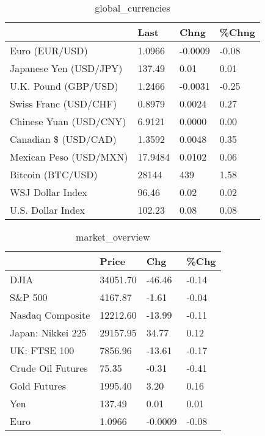 \documentclass{article}%
\begin{document}
%


\begin{table}[htbp]%
\caption{global\_currencies}%
\centering%
\begin{adjustbox}{width=1\textwidth}%
\begin{tabular}{llll}
\toprule
                       &    Last &    Chng & \%Chng \\
\midrule
        Euro (EUR/USD) &  1.0966 & -0.0009 & -0.08 \\
Japanese Yen (USD/JPY) &  137.49 &    0.01 &  0.01 \\
  U.K. Pound (GBP/USD) &  1.2466 & -0.0031 & -0.25 \\
 Swiss Franc (USD/CHF) &  0.8979 &  0.0024 &  0.27 \\
Chinese Yuan (USD/CNY) &  6.9121 &  0.0000 &  0.00 \\
  Canadian \$ (USD/CAD) &  1.3592 &  0.0048 &  0.35 \\
Mexican Peso (USD/MXN) & 17.9484 &  0.0102 &  0.06 \\
     Bitcoin (BTC/USD) &   28144 &     439 &  1.58 \\
      WSJ Dollar Index &   96.46 &    0.02 &  0.02 \\
     U.S. Dollar Index &  102.23 &    0.08 &  0.08 \\
\bottomrule
\end{tabular}
%
\end{adjustbox}%
\end{table}

%


\begin{table}[htbp]%
\caption{market\_overview}%
\centering%
\begin{adjustbox}{width=1\textwidth}%
\begin{tabular}{llll}
\toprule
                  &    Price &     Chg &  \%Chg \\
\midrule
             DJIA & 34051.70 &  -46.46 & -0.14 \\
          S\&P 500 &  4167.87 &   -1.61 & -0.04 \\
 Nasdaq Composite & 12212.60 &  -13.99 & -0.11 \\
Japan: Nikkei 225 & 29157.95 &   34.77 &  0.12 \\
     UK: FTSE 100 &  7856.96 &  -13.61 & -0.17 \\
Crude Oil Futures &    75.35 &   -0.31 & -0.41 \\
     Gold Futures &  1995.40 &    3.20 &  0.16 \\
              Yen &   137.49 &    0.01 &  0.01 \\
             Euro &   1.0966 & -0.0009 & -0.08 \\
\bottomrule
\end{tabular}
%
\end{adjustbox}%
\end{table}

%
\end{document}
